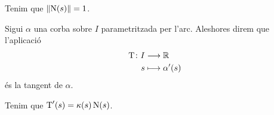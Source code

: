\documentclass[../Apunts.tex]{subfiles}
\begin{document}
	\begin{observation}
		\label{obs:la normal a una corba és unitària}
		Tenim que \(\norm{\normal(s)}=1\).
	\end{observation}
	\begin{definition}
		\label{def:tangent}
		Sigui \(\alpha\) una corba sobre \(I\) parametritzada per l'arc. Aleshores direm que l'aplicació
		\begin{align*}
			\operatorname{T}\colon I&\longrightarrow\mathbb{R} \\
			s&\longmapsto\alpha'(s)
		\end{align*}
		és la tangent de \(\alpha\).
	\end{definition}
	\begin{observation}
		\label{obs:la derivada de la tangent és la curvatura per la normal}
		Tenim que \(\operatorname{T}'(s)=\operatorname{\kappa}(s)\operatorname{N}(s)\).
	\end{observation}
\end{document}
